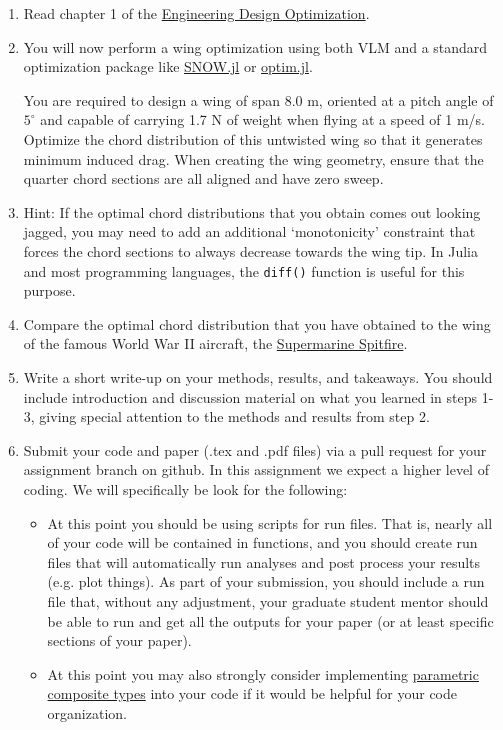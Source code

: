 \documentclass[12pt]{article}
\begin{document}
\begin{enumerate}
	\item Read chapter 1 of the \href{http://flowlab.groups.et.byu.net/mdobook.pdf}{Engineering Design Optimization}. 
	\item You will now perform a wing optimization using both VLM and a standard optimization package like \href{https://github.com/byuflowlab/SNOW.jl}{SNOW.jl} or \href{https://github.com/JuliaNLSolvers/Optim.jl}{optim.jl}.
	
	You are required to design a wing of span 8.0 m, oriented at a pitch angle of $5^\circ$ and capable of carrying 1.7 N of weight when flying at a speed of 1 m/s. Optimize the chord distribution of this untwisted wing so that it generates minimum induced drag. When creating the wing geometry, ensure that the quarter chord sections are all aligned and have zero sweep.
	
	\item[] Hint: If the optimal chord distributions that you obtain comes out looking jagged, you may need to add an additional `monotonicity' constraint that forces the chord sections to always decrease towards the wing tip. In Julia and most programming languages, the \verb*|diff()| function is useful for this purpose.
	
	\item Compare the optimal chord distribution that you have obtained to the wing of the famous World War II aircraft, the \href{https://en.wikipedia.org/wiki/Supermarine_Spitfire}{Supermarine Spitfire}.
	
	\item Write a short write-up on your methods, results, and takeaways. You should include introduction and discussion material on what you learned in steps 1-3, giving special attention to the methods and results from step 2.
		
	\item Submit your code and paper (.tex and .pdf files) via a pull request for your assignment branch on github. In this assignment we expect a higher level of coding. We will specifically be look for the following: 
	\begin{itemize}
		\item At this point you should be using scripts for run files.  That is, nearly all of your code will be contained in functions, and you should create run files that will automatically run analyses and post process your results (e.g. plot things).  As part of your submission, you should include a run file that, without any adjustment, your graduate student mentor should be able to run and get all the outputs for your paper (or at least specific sections of your paper).
		\item At this point you may also strongly consider implementing \href{https://docs.julialang.org/en/v1/manual/types/#Composite-Types}{parametric composite types} into your code if it would be helpful for your code organization. 
	\end{itemize}
\end{enumerate}
\end{document}
